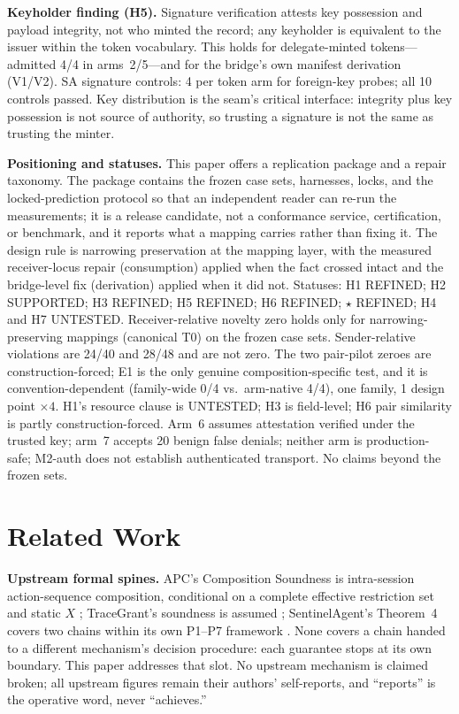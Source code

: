 \documentclass[sigconf,anonymous,nonacm]{acmart}
\newcommand{\code}[1]{\texttt{\detokenize{#1}}}
\newcommand{\status}[1]{\textsc{#1}}
\newcommand{\seamstar}{\ensuremath{\star}}
\begin{document}
\textbf{Keyholder finding (H5).} Signature verification attests key possession and payload integrity, not who minted the record; any keyholder is equivalent to the issuer within the token vocabulary. This holds for delegate-minted tokens---\code{keyholder_widen} admitted 4/4 in arms~2/5---and for the bridge's own manifest derivation (V1/V2). SA signature controls: 4 \code{SIGNATURE_INVALID} per token arm for foreign-key probes; all 10 controls passed. Key distribution is the seam's critical interface: integrity plus key possession is not source of authority, so trusting a signature is not the same as trusting the minter.

\textbf{Positioning and statuses.} This paper offers a replication package and a repair taxonomy. The package contains the frozen case sets, harnesses, locks, and the locked-prediction protocol so that an independent reader can re-run the measurements; it is a release candidate, not a conformance service, certification, or benchmark, and it reports what a mapping carries rather than fixing it. The design rule is narrowing preservation at the mapping layer, with the measured receiver-locus repair (consumption) applied when the fact crossed intact and the bridge-level fix (derivation) applied when it did not. Statuses: H1 \status{REFINED}; H2 \status{SUPPORTED}; H3 \status{REFINED}; H5 \status{REFINED}; H6 \status{REFINED}; \seamstar{} \status{REFINED}; H4 and H7 \status{UNTESTED}. Receiver-relative novelty zero holds only for narrowing-preserving mappings (canonical T0) on the frozen case sets. Sender-relative violations are 24/40 and 28/48 and are not zero. The two pair-pilot zeroes are construction-forced; E1 is the only genuine composition-specific test, and it is convention-dependent (family-wide 0/4 vs.\ arm-native 4/4), one family, 1 design point $\times 4$. H1's resource clause is \status{UNTESTED}; H3 is field-level; H6 pair similarity is partly construction-forced. Arm~6 assumes attestation verified under the trusted key; arm~7 accepts 20 benign false denials; neither arm is production-safe; M2-auth does not establish authenticated transport. No claims beyond the frozen sets.

\section{Related Work}
\label{sec:related}

\textbf{Upstream formal spines.} APC's Composition Soundness is intra-session action-sequence composition, conditional on a complete effective restriction set and static $X$ \cite{apc}; TraceGrant's soundness is assumed \cite{tracegrant}; SentinelAgent's Theorem~4 covers two chains within its own P1--P7 framework \cite{sentinelagent}. None covers a chain handed to a different mechanism's decision procedure: each guarantee stops at its own boundary. This paper addresses that slot. No upstream mechanism is claimed broken; all upstream figures remain their authors' self-reports, and ``reports'' is the operative word, never ``achieves.''
\end{document}
